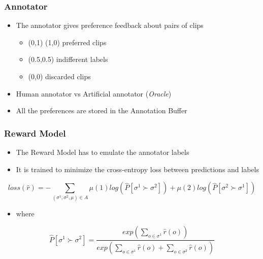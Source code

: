 \begin{frame}
\frametitle{Annotator}
\begin{itemize}
    \item The annotator gives preference feedback about pairs of clips
    \vspace{0.2cm}
    \begin{itemize}
        \item (0,1) (1,0) preferred clips
        \item (0.5,0.5) indifferent labels
        \item (0,0) discarded clips
    \end{itemize}
    \vspace{0.4cm}
    \item<2-> Human annotator vs Artificial annotator (\textit{Oracle})
    \vspace{0.4cm}
    \item<3-> All the preferences are stored in the Annotation Buffer
    
    
\end{itemize}
\end{frame}

\begin{frame}
\frametitle{Reward Model}
\begin{itemize}
    \item The Reward Model has to emulate the annotator labels
    \item It is trained to minimize the cross-entropy loss between predictions and labels
\end{itemize}

\vspace{0.2cm}

\begin{equation*}
    loss(\hat{r}) = - \sum_{(\sigma^1,\sigma^2,\mu)\in A} \mu(1)log(\hat{P}[\sigma^1 \succ \sigma^2]) + \mu(2)log(\hat{P}[\sigma^2 \succ \sigma^1])
\end{equation*}

\begin{itemize}
    \item where
\end{itemize}

\begin{equation*}
    \hat{P}[\sigma^1 \succ \sigma^2] = \frac{exp(\sum_{o \in \sigma^1} \hat{r}(o))}{exp(\sum_{o \in \sigma^1} \hat{r}(o) + \sum_{o \in \sigma^2} \hat{r}(o))}
\end{equation*}



\end{frame}


